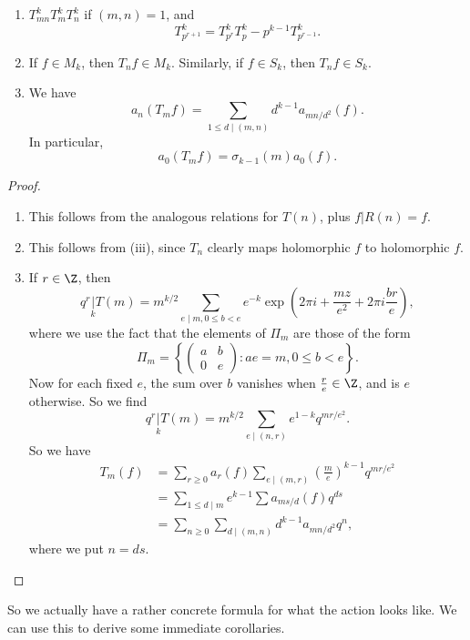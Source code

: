 \documentclass[a4paper]{article}
\begin{document}
\begin{prop}\leavevmode
  \begin{enumerate}
    \item $T_{mn}^k T_m^k T_n^k$ if $(m, n) = 1$, and
      \[
        T_{p^{r + 1}}^k = T_{p^r}^k T_p^k - p^{k - 1} T_{p^{r - 1}}^k.
      \]
     \item If $f \in M_k$, then $T_n f \in M_k$. Similarly, if $f \in S_k$, then $T_n f \in S_k$.
     \item We have
       \[
         a_n (T_m f) = \sum_{1 \leq d \mid (m, n)} d^{k - 1}a_{mn/d^2} (f).
       \]
       In particular,
       \[
         a_0(T_m f) = \sigma_{k - 1}(m) a_0(f).
       \]
  \end{enumerate}
\end{prop}
\begin{proof}\leavevmode
  \begin{enumerate}
    \item This follows from the analogous relations for $T(n)$, plus $f|R(n) = f$.
    \item This follows from (iii), since $T_n$ clearly maps holomorphic $f$ to holomorphic $f$.
    \item If $r \in \Z$, then
      \[
        q^r \underset{k}{|} T(m) = m^{k/2} \sum_{e \mid m, 0 \leq b < e} e^{-k}\exp\left(2\pi i + \frac{mz}{e^2} + 2\pi i \frac{br}{e}\right),
      \]
      where we use the fact that the elements of $\Pi_m$ are those of the form
      \[
        \Pi_m = \left\{
          \begin{pmatrix}
            a & b\\
            0 & e
          \end{pmatrix} : ae = m, 0 \leq b < e
        \right\}.
      \]
      Now for each fixed $e$, the sum over $b$ vanishes when $\frac{r}{e} \in \Z$, and is $e$ otherwise. So we find
      \[
        q^r \underset{k}{|} T(m) = m^{k/2} \sum_{e \mid (n, r)} e^{1 - k} q^{mr/e^2}.
      \]
      So we have
      \begin{align*}
        T_m(f) &= \sum_{r \geq 0} a_r(f) \sum_{e \mid (m, r)} \left(\frac{m}{e}\right)^{k - 1} q^{mr/e^2} \\
        &= \sum_{1 \leq d \mid m} e^{k - 1} \sum a_{ms/d} (f) q^{ds} \\
        &= \sum_{n \geq 0} \sum_{d \mid (m, n)} d^{k - 1} a_{mn/d^2} q^n,
      \end{align*}
      where we put $n = ds$.
  \end{enumerate}
\end{proof}
So we actually have a rather concrete formula for what the action looks like. We can use this to derive some immediate corollaries.
\end{document}
